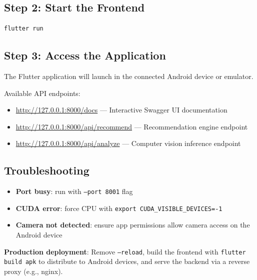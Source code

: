 \subsection*{Step 2: Start the Frontend}

\begin{codebox}
\begin{verbatim}
flutter run
\end{verbatim}
\end{codebox}

\subsection*{Step 3: Access the Application}

\large
The Flutter application will launch in the connected Android device or emulator.

\vspace{0.4cm}

Available API endpoints:
\begin{itemize}
    \item \url{http://127.0.0.1:8000/docs} --- Interactive Swagger UI documentation
    \item \url{http://127.0.0.1:8000/api/recommend} --- Recommendation engine endpoint
    \item \url{http://127.0.0.1:8000/api/analyze} --- Computer vision inference endpoint
\end{itemize}
\normalsize

\subsection*{Troubleshooting}

\begin{itemize}
    \item \textbf{Port busy}: run with \texttt{--port 8001} flag
    \item \textbf{CUDA error}: force CPU with \texttt{export CUDA\_VISIBLE\_DEVICES=-1}
    \item \textbf{Camera not detected}: ensure app permissions allow camera access on the Android device
\end{itemize}

\large
\noindent\textbf{Production deployment}: Remove \texttt{--reload}, build the frontend with \texttt{flutter build apk} to distribute to Android devices, and serve the backend via a reverse proxy (e.g., nginx).
\normalsize

